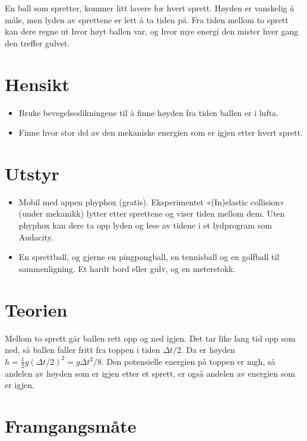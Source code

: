 \documentclass[11pt]{article}
\begin{document}

En ball som spretter, kommer litt lavere for hvert sprett. Høyden er vanskelig å måle, men lyden av sprettene er lett å ta tiden på. Fra tiden mellom to sprett kan dere regne ut hvor høyt ballen var, og hvor mye energi den mister hver gang den treffer gulvet.

\section*{Hensikt}

\begin{itemize}
\item Bruke bevegelseslikningene til å finne høyden fra tiden ballen er i lufta.
\item Finne hvor stor del av den mekaniske energien som er igjen etter hvert sprett.
\end{itemize}

\section*{Utstyr}

\begin{itemize}
\item Mobil med appen phyphox (gratis). Eksperimentet «(In)elastic collision» (under mekanikk) lytter etter sprettene og viser tiden mellom dem. Uten phyphox kan dere ta opp lyden og lese av tidene i et lydprogram som Audacity.
\item En sprettball, og gjerne en pingpongball, en tennisball og en golfball til sammenligning. Et hardt bord eller gulv, og en meterstokk.
\end{itemize}

\section*{Teorien}

Mellom to sprett går ballen rett opp og ned igjen. Det tar like lang tid opp som ned, så ballen faller fritt fra toppen i tiden $Δt/2$. Da er høyden $h = \tfrac{1}{2}g(Δt/2)^{2} = gΔt^{2}/8$. Den potensielle energien på toppen er mgh, så andelen av høyden som er igjen etter et sprett, er også andelen av energien som er igjen.

\section*{Framgangsmåte}
\end{document}
